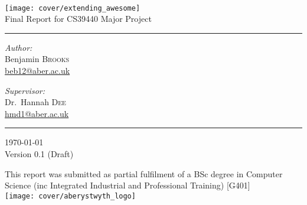 \begin{titlepage}
	\begin{center}
	
	~\\
	
	\vspace{3cm}
	\texttt{[image: cover/extending\_awesome]} \\
	\vspace{1.5cm}
	{ \large Final Report for CS39440 Major Project }
	\vspace{1cm}

	\hrule
	\vspace{0.5cm}
	
	\noindent
	\begin{minipage}[t]{0.4\textwidth}
		\begin{flushleft} \large
			\emph{Author:}\\
			Benjamin \textsc{Brooks}\\
			\href{mailto:beb12@aber.ac.uk}{beb12@aber.ac.uk}
		\end{flushleft}
	\end{minipage}%
	\begin{minipage}[t]{0.4\textwidth}
		\begin{flushright} \large
			\emph{Supervisor:} \\
			Dr.~Hannah \textsc{Dee}\\
			\href{mailto:hmd1@aber.ac.uk}{hmd1@aber.ac.uk}
		\end{flushright}
	\end{minipage}
	
	\vspace{0.5cm}
	\hrule

	\vfill

	{\large \today \\ Version 0.1 (Draft)}
	
	\vspace{1cm}
	This report was submitted as partial fulfilment of a BSc degree in Computer Science (inc Integrated Industrial and Professional Training) [G401] \\
	\vspace{1cm}
	\texttt{[image: cover/aberystwyth\_logo]}
	
	\vspace{-2cm}

	\end{center}
\end{titlepage}

